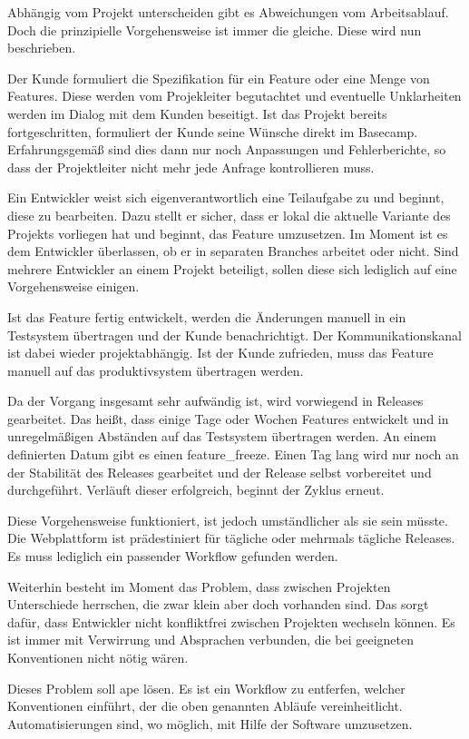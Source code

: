 Abhängig vom Projekt unterscheiden gibt es Abweichungen vom Arbeitsablauf. Doch die prinzipielle Vorgehensweise ist immer die gleiche. Diese wird nun beschrieben.

Der Kunde formuliert die Spezifikation für ein Feature oder eine Menge von Features. Diese werden vom Projekleiter begutachtet und eventuelle Unklarheiten werden im Dialog mit dem Kunden beseitigt. Ist das Projekt bereits fortgeschritten, formuliert der Kunde seine Wünsche direkt im Basecamp. Erfahrungsgemäß sind dies dann nur noch Anpassungen und Fehlerberichte, so dass der Projektleiter nicht mehr jede Anfrage kontrollieren muss.

Ein Entwickler weist sich eigenverantwortlich eine Teilaufgabe zu und beginnt, diese zu bearbeiten. Dazu stellt er sicher, dass er lokal die aktuelle Variante des Projekts vorliegen hat und beginnt, das Feature umzusetzen. Im Moment ist es dem Entwickler überlassen, ob er in separaten Branches arbeitet oder nicht. Sind mehrere Entwickler an einem Projekt beteiligt, sollen diese sich lediglich auf eine Vorgehensweise einigen.

Ist das Feature fertig entwickelt, werden die Änderungen manuell in ein Testsystem übertragen und der Kunde benachrichtigt. Der Kommunikationskanal ist dabei wieder projektabhängig. Ist der Kunde zufrieden, muss das Feature manuell auf das \gls{produktivsystem} übertragen werden.

Da der Vorgang insgesamt sehr aufwändig ist, wird vorwiegend in Releases gearbeitet. Das heißt, dass einige Tage oder Wochen Features entwickelt und in unregelmäßigen Abständen auf das Testsystem übertragen werden. An einem definierten Datum gibt es einen \gls{feature_freeze}. Einen Tag lang wird nur noch an der Stabilität des Releases gearbeitet und der Release selbst vorbereitet und durchgeführt. Verläuft dieser erfolgreich, beginnt der Zyklus erneut.

Diese Vorgehensweise funktioniert, ist jedoch umständlicher als sie sein müsste. Die Webplattform ist prädestiniert für tägliche oder mehrmals tägliche Releases. Es muss lediglich ein passender Workflow gefunden werden.

Weiterhin besteht im Moment das Problem, dass zwischen Projekten Unterschiede herrschen, die zwar klein aber doch vorhanden sind. Das sorgt dafür, dass Entwickler nicht konfliktfrei zwischen Projekten wechseln können. Es ist immer mit Verwirrung und Absprachen verbunden, die bei geeigneten Konventionen nicht nötig wären.

Dieses Problem soll \gls{ape} lösen. Es ist ein Workflow zu entferfen, welcher Konventionen einführt, der die oben genannten Abläufe vereinheitlicht. Automatisierungen sind, wo möglich, mit Hilfe der Software umzusetzen.

